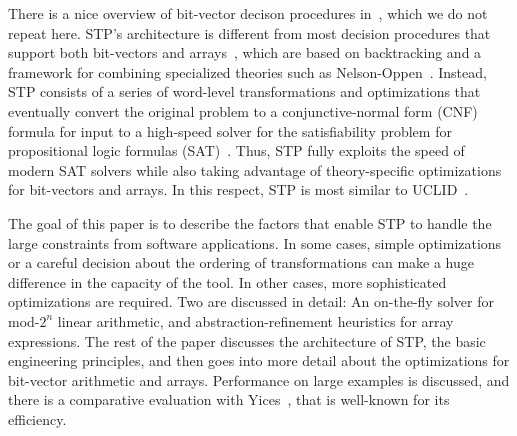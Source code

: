 There is a nice overview of bit-vector decison procedures
in~\cite{uclid07}, which we do not repeat here.  STP's architecture is
different from most decision procedures that support both bit-vectors
and arrays~\cite{cvc,cvcl,yices}, which are based on backtracking and
a framework for combining specialized theories such as
Nelson-Oppen~\cite{nelsonoppen}. Instead, STP consists of a series of
word-level transformations and optimizations that eventually convert
the original problem to a conjunctive-normal form (CNF) formula for
input to a high-speed solver for the satisfiability problem for
propositional logic formulas (SAT)~\cite{minisat}.  Thus, STP fully
exploits the speed of modern SAT solvers while also taking advantage
of theory-specific optimizations for bit-vectors and arrays.  In this
respect, STP is most similar to UCLID~\cite{uclid}.

The goal of this paper is to describe the factors that enable STP to
handle the large constraints from software applications.  In some
cases, simple optimizations or a careful decision about the ordering
of transformations can make a huge difference in the capacity of the
tool.  In other cases, more sophisticated optimizations are required.
Two are discussed in detail: An on-the-fly solver for mod-$2^n$ linear
arithmetic, and abstraction-refinement heuristics for array
expressions. The rest of the paper discusses the architecture of STP,
the basic engineering principles, and then goes into more detail about
the optimizations for bit-vector arithmetic and arrays. Performance on
large examples is discussed, and there is a comparative evaluation
with Yices~\cite{yices}, that is well-known for its efficiency.
